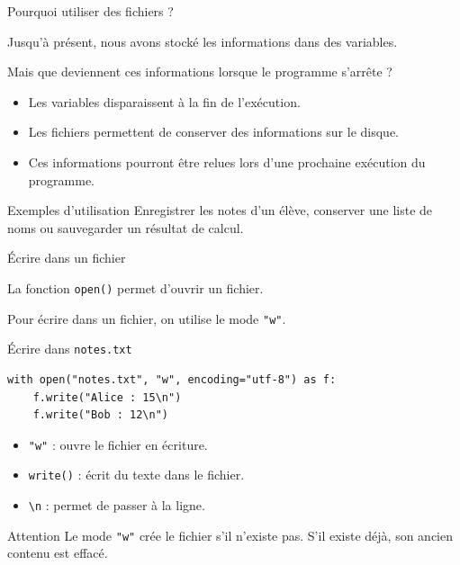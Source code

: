 \documentclass[10pt]{beamer}
\begin{document}
\begin{frame}{Pourquoi utiliser des fichiers ?}

Jusqu'à présent, nous avons stocké les informations
dans des variables.

Mais que deviennent ces informations lorsque le programme
s'arrête ?

\begin{itemize}
    \item Les variables disparaissent à la fin de l'exécution.
    \item Les fichiers permettent de conserver des informations
    sur le disque.
    \item Ces informations pourront être relues lors d'une
    prochaine exécution du programme.
\end{itemize}

\begin{exampleblock}{Exemples d'utilisation}
\small
Enregistrer les notes d'un élève, conserver une liste de noms
ou sauvegarder un résultat de calcul.
\end{exampleblock}

\end{frame}
\begin{frame}[fragile]{Écrire dans un fichier}

La fonction \texttt{open()} permet d'ouvrir un fichier.

Pour écrire dans un fichier, on utilise le mode \texttt{"w"}.

\begin{exampleblock}{Écrire dans \texttt{notes.txt}}
\small
\begin{lstlisting}
with open("notes.txt", "w", encoding="utf-8") as f:
    f.write("Alice : 15\n")
    f.write("Bob : 12\n")
\end{lstlisting}
\end{exampleblock}

\begin{itemize}
    \item \texttt{"w"} : ouvre le fichier en écriture.
    \item \texttt{write()} : écrit du texte dans le fichier.
    \item \texttt{\textbackslash n} : permet de passer à la ligne.
\end{itemize}

\begin{alertblock}{Attention}
\small
Le mode \texttt{"w"} crée le fichier s'il n'existe pas.
S'il existe déjà, son ancien contenu est effacé.
\end{alertblock}

\end{frame}
\end{document}
